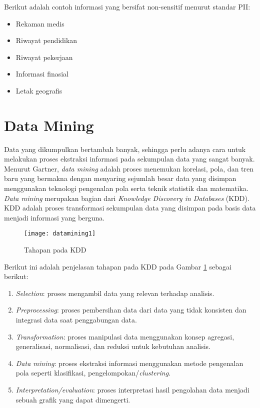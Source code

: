 \noindent Berikut adalah contoh informasi yang bersifat non-sensitif menurut standar PII:
\begin{itemize}
\item Rekaman medis
\item Riwayat pendidikan
\item Riwayat pekerjaan 
\item Informasi finasial
\item Letak geografis
\end{itemize}

\newpage
\section{Data Mining}
Data yang dikumpulkan bertambah banyak, sehingga perlu adanya cara untuk melakukan proses ekstraksi informasi pada sekumpulan data yang sangat banyak. Menurut Gartner, \textit{data mining} adalah proses menemukan korelasi, pola, dan tren baru yang bermakna dengan menyaring sejumlah besar data yang disimpan menggunakan teknologi pengenalan pola serta teknik statistik dan matematika. \textit{Data mining} merupakan bagian dari \textit{Knowledge Discovery in Databases} (KDD). KDD adalah proses transformasi sekumpulan data yang disimpan pada basis data menjadi informasi yang berguna.\\

\begin{figure}[H]
	\centering
	\texttt{[image: datamining1]}
	\caption{Tahapan pada KDD}
	\label{fig:datamining1}
\end{figure}

\noindent Berikut ini adalah penjelasan tahapan pada KDD pada Gambar \ref{fig:datamining1} sebagai berikut:

\begin{enumerate}
\item \textit{Selection}: proses mengambil data yang relevan terhadap analisis.
\item \textit{Preprocessing}: proses pembersihan data dari data yang tidak konsisten dan integrasi data saat penggabungan data.
\item \textit{Transformation}: proses manipulasi data menggunakan konsep agregasi, generalisasi, normalisasi, dan reduksi untuk kebutuhan analisis.
\item \textit{Data mining}: proses ekstraksi informasi menggunakan metode pengenalan pola seperti klasifikasi, pengelompokan/\textit{clustering}.
\item \textit{Interpretation/evaluation}: proses interpretasi hasil pengolahan data menjadi sebuah grafik yang dapat dimengerti.
\end{enumerate}


